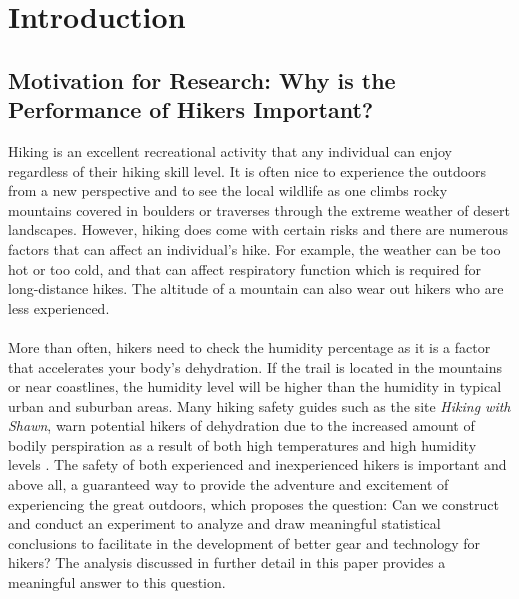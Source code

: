 

\chapter{Introduction}
\label{chapter1}
\thispagestyle{empty}

\section{Motivation for Research: Why is the Performance of Hikers Important?}
Hiking is an excellent recreational activity that any individual can enjoy regardless of their hiking skill level. It is often nice to experience the outdoors from a new perspective and to see the local wildlife as one climbs rocky mountains covered in boulders or traverses through the extreme weather of desert landscapes. However, hiking does come with certain risks and there are numerous factors that can affect an individual's hike. For example, the weather can be too hot or too cold, and that can affect respiratory function which is required for long-distance hikes. The altitude of a mountain can also wear out hikers who are less experienced.
\\\\
More than often, hikers need to check the humidity percentage as it is a factor that accelerates your body's dehydration. If the trail is located in the mountains or near coastlines, the humidity level will be higher than the humidity in typical urban and suburban areas. Many hiking safety guides such as the site \emph{Hiking with Shawn}, warn potential hikers of dehydration due to the increased amount of bodily perspiration as a result of both high temperatures and high humidity levels \cite{key1}. The safety of both experienced and inexperienced hikers is important and above all, a guaranteed way to provide the adventure and excitement of experiencing the great outdoors, which proposes the question: Can we construct and conduct an experiment to analyze and draw meaningful statistical conclusions to facilitate in the development of better gear and technology for hikers? The analysis discussed in further detail in this paper provides a meaningful answer to this question.